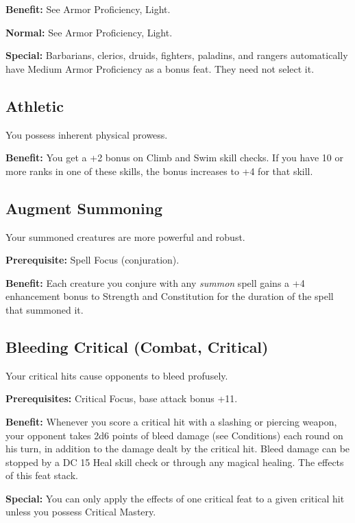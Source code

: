 \textbf{Benefit:} See Armor Proficiency, Light.
				
\textbf{Normal:} See Armor Proficiency, Light.
				
\textbf{Special:} Barbarians, clerics, druids, fighters, paladins, and rangers automatically have Medium Armor Proficiency as a bonus feat. They need not select it.
				
\subsection{Athletic}

				
You possess inherent physical prowess.
				
\textbf{Benefit:} You get a +2 bonus on Climb and Swim skill checks. If you have 10 or more ranks in one of these skills, the bonus increases to +4 for that skill.
				
\subsection{Augment Summoning}

				
Your summoned creatures are more powerful and robust.
				
\textbf{Prerequisite:} Spell Focus (conjuration).
				
\textbf{Benefit:} Each creature you conjure with any \textit{summon }spell gains a +4 enhancement bonus to Strength and Constitution for the duration of the spell that summoned it.
				
\subsection{Bleeding Critical (Combat, Critical)}

				
Your critical hits cause opponents to bleed profusely.
				
\textbf{Prerequisites:} Critical Focus, base attack bonus +11.
				
\textbf{Benefit:} Whenever you score a critical hit with a slashing or piercing weapon, your opponent takes 2d6 points of bleed damage (see Conditions) each round on his turn, in addition to the damage dealt by the critical hit. Bleed damage can be stopped by a DC 15 Heal skill check or through any magical healing. The effects of this feat stack.
				
\textbf{Special:} You can only apply the effects of one critical feat to a given critical hit unless you possess Critical Mastery.
				

